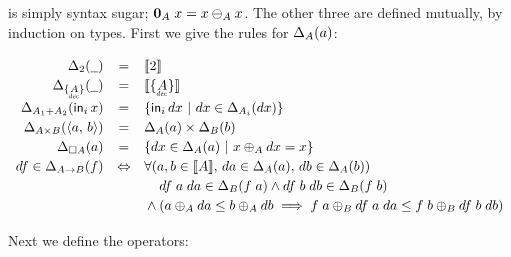 \documentclass{article}
\begin{document}
\zero{} is simply syntax sugar; $\mathbf{0}_A\; x = x \ominus_A x$. The other three
are defined mutually, by induction on types. First we give the rules for
$\Delta_{A}({a})$:

\[
\def\arraystretch{1.2}
\begin{array}{rcl}
  \Change{\tbool}{\pwild} &=& \Den{\tbool}
  \\
  \Change{\Seteq{A}}{\pwild} &=& \Den{\Seteq{A}}
  \\
  \Change{A_1 + A_2}{\inj{i}{x}}
  &=& \setfor{\inj{i}{dx}}{dx \in \Change{A_i}{dx}}
  \\
  \Change{A \x B}{\pair{a}{b}}
  &=& \Change{A}{a} \x \Change{B}{b}
  \\
  \Change{\Disc{A}}{a}
  &=& \setfor{dx \in \Change{A}{a}}{x \oplus_A dx = x}
  \\
  df \in \Change{A \to B}{f}
  &\Leftrightarrow&
  \forall({a,b \in \Den{A}},\, da \in \Change{A}{a},\, db \in \Change{A}{b})\\
  &&\phantom{{}\wedge{}}
  df\; a\; da \in \Change{B}{f\; a}
  \wedge df\;b\;db \in \Change{B}{f\; b}
  \\
  &&{}\wedge (a \oplus_A da \le b \oplus_A db \implies
  f\;a \oplus_B df\;a\;da \le f\;b \oplus_B df\;b\;db)
\end{array}
\]

Next we define the operators:
\begin{center}
\end{center}
\end{document}
